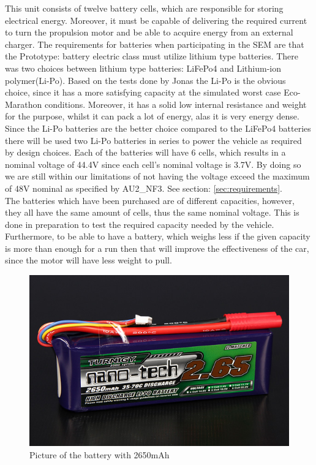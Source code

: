 This unit consists of twelve battery cells, which are responsible for storing electrical energy. Moreover, it must be capable of delivering the required current to turn the propulsion motor and be able to acquire energy from an external charger.   
The requirements for batteries when participating in the SEM are that the Prototype: battery electric class must utilize lithium type batteries. There was two choices between lithium type batteries: LiFePo4 and Lithium-ion polymer(Li-Po). Based on the tests done by Jonas \cite{BMSBatteryTest} the Li-Po is the obvious choice, since it has a more satisfying capacity at the simulated worst case Eco-Marathon conditions. Moreover, it has a solid low internal resistance and weight for the purpose, whilst it can pack a lot of energy, alas it is very energy dense.\\
Since the Li-Po batteries are the better choice compared to the LiFePo4 batteries there will be used two Li-Po batteries in series to power the vehicle as required by design choices. Each of the batteries will have 6 cells, which results in a nominal voltage of 44.4V since each cell's nominal voltage is 3.7V. By doing so we are still within our limitations of not having the voltage exceed the maximum of 48V nominal as specified by AU2\_NF3. See section: \vref{sec:requirements}.\\
The batteries which have been purchased are of different capacities, however, they all have the same amount of cells, thus the same nominal voltage. This is done in preparation to test the required capacity needed by the vehicle. Furthermore, to be able to have a battery, which weighs less if the given capacity is more than enough for a run then that will improve the effectiveness of the car, since the motor will have less weight to pull.\\

\begin{figure}[H]
	\centering
	\includegraphics[width=0.6\linewidth]{Hardware/Pictures/2650battery}
	\caption[Empty]{Picture of the battery with 2650mAh\footnotemark}
	\label{fig:2650battery}
\end{figure}

